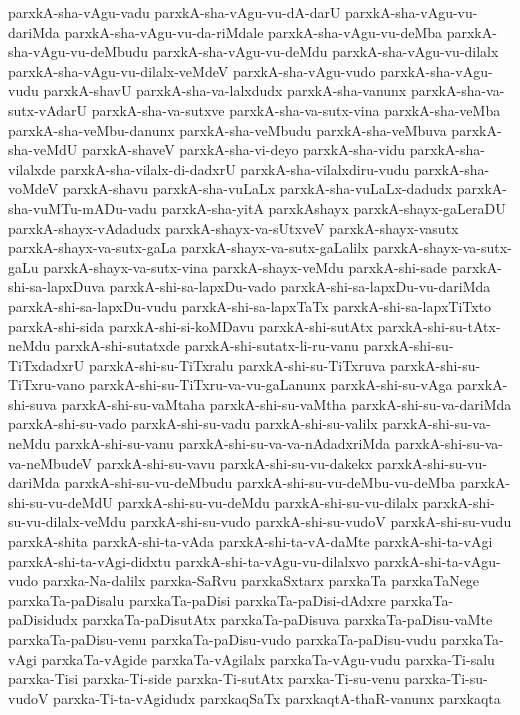 {parxkA-sha-vAgu-vadu
parxkA-sha-vAgu-vu-dA-darU
parxkA-sha-vAgu-vu-dariMda
parxkA-sha-vAgu-vu-da-riMdale
parxkA-sha-vAgu-vu-deMba
parxkA-sha-vAgu-vu-deMbudu
parxkA-sha-vAgu-vu-deMdu
parxkA-sha-vAgu-vu-dilalx
parxkA-sha-vAgu-vu-dilalx-veMdeV
parxkA-sha-vAgu-vudo
parxkA-sha-vAgu-vudu
parxkA-shavU
parxkA-sha-va-lalxdudx
parxkA-sha-vanunx
parxkA-sha-va-sutx-vAdarU
parxkA-sha-va-sutxve
parxkA-sha-va-sutx-vina
parxkA-sha-veMba
parxkA-sha-veMbu-danunx
parxkA-sha-veMbudu
parxkA-sha-veMbuva
parxkA-sha-veMdU
parxkA-shaveV
parxkA-sha-vi-deyo
parxkA-sha-vidu
parxkA-sha-vilalxde
parxkA-sha-vilalx-di-dadxrU
parxkA-sha-vilalxdiru-vudu
parxkA-sha-voMdeV
parxkA-shavu
parxkA-sha-vuLaLx
parxkA-sha-vuLaLx-dadudx
parxkA-sha-vuMTu-mADu-vadu
parxkA-sha-yitA
parxkAshayx
parxkA-shayx-gaLeraDU
parxkA-shayx-vAdadudx
parxkA-shayx-va-sUtxveV
parxkA-shayx-vasutx
parxkA-shayx-va-sutx-gaLa
parxkA-shayx-va-sutx-gaLalilx
parxkA-shayx-va-sutx-gaLu
parxkA-shayx-va-sutx-vina
parxkA-shayx-veMdu
parxkA-shi-sade
parxkA-shi-sa-lapxDuva
parxkA-shi-sa-lapxDu-vado
parxkA-shi-sa-lapxDu-vu-dariMda
parxkA-shi-sa-lapxDu-vudu
parxkA-shi-sa-lapxTaTx
parxkA-shi-sa-lapxTiTxto
parxkA-shi-sida
parxkA-shi-si-koMDavu
parxkA-shi-sutAtx
parxkA-shi-su-tAtx-neMdu
parxkA-shi-sutatxde
parxkA-shi-sutatx-li-ru-vanu
parxkA-shi-su-TiTxdadxrU
parxkA-shi-su-TiTxralu
parxkA-shi-su-TiTxruva
parxkA-shi-su-TiTxru-vano
parxkA-shi-su-TiTxru-va-vu-gaLanunx
parxkA-shi-su-vAga
parxkA-shi-suva
parxkA-shi-su-vaMtaha
parxkA-shi-su-vaMtha
parxkA-shi-su-va-dariMda
parxkA-shi-su-vado
parxkA-shi-su-vadu
parxkA-shi-su-valilx
parxkA-shi-su-va-neMdu
parxkA-shi-su-vanu
parxkA-shi-su-va-va-nAdadxriMda
parxkA-shi-su-va-va-neMbudeV
parxkA-shi-su-vavu
parxkA-shi-su-vu-dakekx
parxkA-shi-su-vu-dariMda
parxkA-shi-su-vu-deMbudu
parxkA-shi-su-vu-deMbu-vu-deMba
parxkA-shi-su-vu-deMdU
parxkA-shi-su-vu-deMdu
parxkA-shi-su-vu-dilalx
parxkA-shi-su-vu-dilalx-veMdu
parxkA-shi-su-vudo
parxkA-shi-su-vudoV
parxkA-shi-su-vudu
parxkA-shita
parxkA-shi-ta-vAda
parxkA-shi-ta-vA-daMte
parxkA-shi-ta-vAgi
parxkA-shi-ta-vAgi-didxtu
parxkA-shi-ta-vAgu-vu-dilalxvo
parxkA-shi-ta-vAgu-vudo
parxka-Na-dalilx
parxka-SaRvu
parxkaSxtarx
parxkaTa
parxkaTaNege
parxkaTa-paDisalu
parxkaTa-paDisi
parxkaTa-paDisi-dAdxre
parxkaTa-paDisidudx
parxkaTa-paDisutAtx
parxkaTa-paDisuva
parxkaTa-paDisu-vaMte
parxkaTa-paDisu-venu
parxkaTa-paDisu-vudo
parxkaTa-paDisu-vudu
parxkaTa-vAgi
parxkaTa-vAgide
parxkaTa-vAgilalx
parxkaTa-vAgu-vudu
parxka-Ti-salu
parxka-Tisi
parxka-Ti-side
parxka-Ti-sutAtx
parxka-Ti-su-venu
parxka-Ti-su-vudoV
parxka-Ti-ta-vAgidudx
parxkaqSaTx
parxkaqtA-thaR-vanunx
parxkaqta
}
